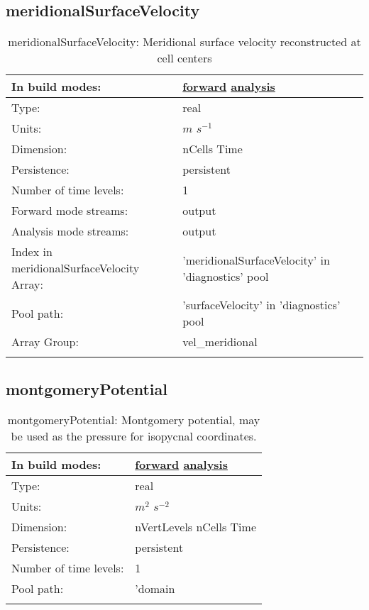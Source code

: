 \subsection[meridionalSurfaceVelocity]{meridionalSurfaceVelocity}
\label{subsec:var_sec_diagnostics_meridionalSurfaceVelocity}
\begin{center}
\begin{longtable}{| p{2.0in} | p{4.0in} |}
        \hline 
        In build modes: & \hyperref[subsec:forward_var_tab_diagnostics]{forward} \hyperref[subsec:analysis_var_tab_diagnostics]{analysis} \\
        \hline 
        Type: & real \\
        \hline 
        Units: & $m$ $s^{-1}$ \\
        \hline 
        Dimension: & nCells Time \\
        \hline 
        Persistence: & persistent \\
        \hline 
        Number of time levels: & 1 \\
        \hline 
		 Forward mode streams: &  output \\
        \hline 
		 Analysis mode streams: &  output \\
        \hline 
		 Index in meridionalSurfaceVelocity Array: & 'meridionalSurfaceVelocity' in 'diagnostics' pool \\
		 \hline 
            Pool path: & 'surfaceVelocity' in 'diagnostics' pool
 \\
		 \hline 
		 Array Group: & vel\_meridional \\
		 \hline 
    \caption{meridionalSurfaceVelocity: Meridional surface velocity reconstructed at cell centers}
\end{longtable}
\end{center}
\subsection[montgomeryPotential]{montgomeryPotential}
\label{subsec:var_sec_diagnostics_montgomeryPotential}
\begin{center}
\begin{longtable}{| p{2.0in} | p{4.0in} |}
        \hline 
        In build modes: & \hyperref[subsec:forward_var_tab_diagnostics]{forward} \hyperref[subsec:analysis_var_tab_diagnostics]{analysis} \\
        \hline 
        Type: & real \\
        \hline 
        Units: & $m^2$ $s^{-2}$ \\
        \hline 
        Dimension: & nVertLevels nCells Time \\
        \hline 
        Persistence: & persistent \\
        \hline 
        Number of time levels: & 1 \\
        \hline 
            Pool path: & 'domain %
 \\
		 \hline 
    \caption{montgomeryPotential: Montgomery potential, may be used as the pressure for isopycnal coordinates.}
\end{longtable}
\end{center}
